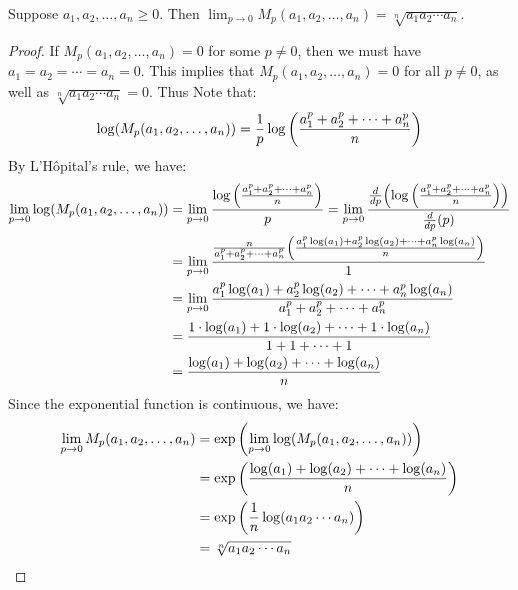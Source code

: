\documentclass[main.tex]{subfiles}
\begin{document}
\begin{proposition}\label{geometric_mean_is_0th_holder_mean}
    Suppose $a_1,a_2,\ldots,a_n\ge0$. Then $\lim_{p\to 0} M_p(a_1,a_2,\ldots,a_n)= \sqrt[n]{a_1a_2\cdots a_n}$.
\end{proposition}
\begin{proof}
    If $M_p(a_1,a_2,\ldots,a_n)=0$ for some $p\ne0$, then we must have $a_1=a_2= \cdots=a_n=0$. This implies that $M_p(a_1,a_2,\ldots,a_n)=0$ for all $p\ne0$, as well as $\sqrt[n]{a_1a_2\cdots a_n}=0$. Thus
    Note that:
    \begin{equation*}
        \log(M_p(a_1,a_2,\ldots,a_n))= \frac{1}{p}\log\qty(\frac{a_1^p+a_2^p+\cdots+a_n^p}{n})
    \end{equation*}
    By L'Hôpital's rule, we have:
    \begin{align*}
        \lim_{p\to 0} \log(M_p(a_1,a_2,\ldots,a_n))
        &= \lim_{p\to 0} \frac{\log\qty(\frac{a_1^p+a_2^p+\cdots+a_n^p}{n})}{p}
        = \lim_{p\to 0} \frac{\dv{p}\qty(\log\qty(\frac{a_1^p+a_2^p+\cdots+a_n^p}{n}))}{\dv{p}(p)} \\
        &= \lim_{p\to 0} \frac{\frac{n}{a_1^p+a_2^p+\cdots+a_n^p}\qty(\frac{a_1^p\log(a_1)+a_2^p\log(a_2)+\cdots+a_n^p\log(a_n)}{n})}{1} \\
        &= \lim_{p\to 0} \frac{a_1^p\log(a_1)+a_2^p\log(a_2)+\cdots+a_n^p\log(a_n)}{a_1^p+a_2^p+\cdots+a_n^p} \\
        &= \frac{1\cdot\log(a_1)+1\cdot\log(a_2)+\cdots+1\cdot\log(a_n)}{1+1+\cdots+1} \\
        &= \frac{\log(a_1)+\log(a_2)+\cdots+\log(a_n)}{n}
    \end{align*}
    Since the exponential function is continuous, we have:
    \begin{align*}
        \lim_{p\to 0} M_p(a_1,a_2,\ldots,a_n)
        &= \exp\qty(\lim_{p\to 0} \log(M_p(a_1,a_2,\ldots,a_n))) \\
        &= \exp\qty(\frac{\log(a_1)+\log(a_2)+\cdots+\log(a_n)}{n}) \\
        &= \exp\qty(\frac{1}{n}\log(a_1a_2\cdots a_n)) \\
        &= \sqrt[n]{a_1a_2\cdots a_n}
    \end{align*}
\end{proof}
\end{document}
